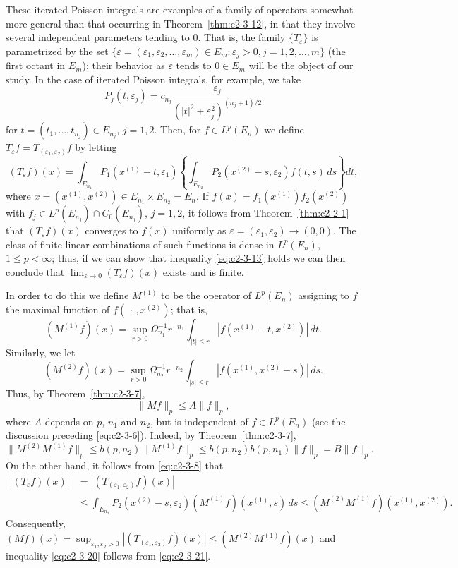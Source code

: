 These iterated Poisson integrals are examples of a family of operators somewhat more general than that occurring in Theorem~\ref{thm:c2-3-12}, in that they involve several independent parameters tending to $0$. That is, the family $\{T_\varepsilon\}$ is parametrized by the set $\{\varepsilon = (\varepsilon_1, \varepsilon_2, \dots, \varepsilon_m) \in E_m : \varepsilon_j > 0, j = 1, 2, \dots, m\}$ (the first octant in $E_m$); their behavior as $\varepsilon$ tends to $0 \in E_m$ will be the object of our study. In the case of iterated Poisson integrals, for example, we take
\[
P_j(t, \varepsilon_j) = c_{n_j} \frac{\varepsilon_j}{(|t|^2 + \varepsilon_j^2)^{(n_j+1)/2}}
\]
for $t = (t_1, \dots, t_{n_j}) \in E_{n_j}$, $j = 1, 2$. Then, for $f \in L^p(E_n)$ we define $T_\varepsilon f = T_{(\varepsilon_1, \varepsilon_2)} f$ by letting
\[
(T_\varepsilon f)(x) = \int_{E_{n_1}} P_1(x^{(1)} - t, \varepsilon_1) \left\{\int_{E_{n_2}} P_2(x^{(2)} - s, \varepsilon_2) f(t, s)\,ds\right\} dt,
\]
where $x = (x^{(1)}, x^{(2)}) \in E_{n_1} \times E_{n_2} = E_n$. If $f(x) = f_1(x^{(1)}) f_2(x^{(2)})$ with $f_j \in L^p(E_{n_j}) \cap C_0(E_{n_j})$, $j = 1, 2$, it follows from Theorem~\ref{thm:c2-2-1} that $(T_\varepsilon f)(x)$ converges to $f(x)$ uniformly as $\varepsilon = (\varepsilon_1, \varepsilon_2) \to (0, 0)$. The class of finite linear combinations of such functions is dense in $L^p(E_n)$, $1 \leq p < \infty$; thus, if we can show that inequality \eqref{eq:c2-3-13} holds we can then conclude that $\lim_{\varepsilon \to 0} (T_\varepsilon f)(x)$ exists and is finite.

In order to do this we define $M^{(1)}$ to be the operator of $L^p(E_n)$ assigning to $f$ the maximal function of $f(\,\cdot\,, x^{(2)})$; that is,
\[
(M^{(1)} f)(x) = \sup_{r > 0} \Omega_{n_1}^{-1} r^{-n_1} \int_{|t| \leq r} |f(x^{(1)} - t, x^{(2)})|\,dt.
\]
Similarly, we let
\[
(M^{(2)} f)(x) = \sup_{r > 0} \Omega_{n_2}^{-1} r^{-n_2} \int_{|s| \leq r} |f(x^{(1)}, x^{(2)} - s)|\,ds.
\]
Thus, by Theorem~\ref{thm:c2-3-7},
\begin{equation}\label{eq:c2-3-20}
\|Mf\|_p \leq A\|f\|_p,
\end{equation}
where $A$ depends on $p$, $n_1$ and $n_2$, but is independent of $f \in L^p(E_n)$ (see the discussion preceding \eqref{eq:c2-3-6}). Indeed, by Theorem~\ref{thm:c2-3-7},
\begin{equation}\label{eq:c2-3-21}
\|M^{(2)} M^{(1)} f\|_p \leq b(p, n_2) \|M^{(1)} f\|_p \leq b(p, n_2) b(p, n_1) \|f\|_p = B \|f\|_p.
\end{equation}
On the other hand, it follows from \eqref{eq:c2-3-8} that
\[
\begin{aligned}
|(T_\varepsilon f)(x)| &= \left|(T_{(\varepsilon_1, \varepsilon_2)} f)(x)\right| \\
&\leq \int_{E_{n_2}} P_2(x^{(2)} - s, \varepsilon_2) (M^{(1)} f)(x^{(1)}, s)\,ds \leq (M^{(2)} M^{(1)} f)(x^{(1)}, x^{(2)}).
\end{aligned}
\]
Consequently, $(Mf)(x) = \sup_{\varepsilon_1, \varepsilon_2 > 0} |(T_{(\varepsilon_1, \varepsilon_2)} f)(x)| \leq (M^{(2)} M^{(1)} f)(x)$ and inequality \eqref{eq:c2-3-20} follows from \eqref{eq:c2-3-21}.

